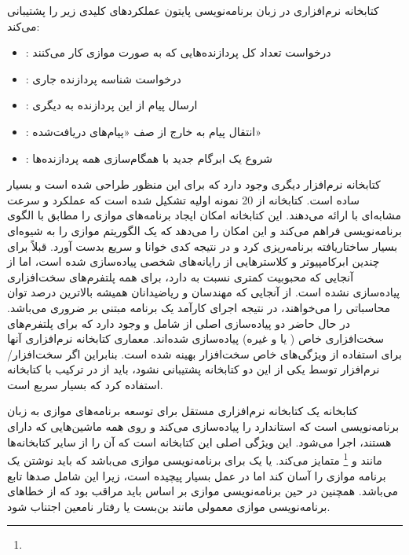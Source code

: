 کتابخانه نرم‌افزاری  در زبان برنامه‌نویسی پایتون عملکردهای کلیدی زیر را پشتیبانی می‌کند: 
\begin{itemize}
	\item 
	: درخواست تعداد کل پردازنده‌هایی که به صورت موازی کار می‌کنند
	\item
	: درخواست شناسه پردازنده جاری   
	\item 
	: ارسال پیام از این پردازنده به دیگری
	\item 
	: انتقال پیام به خارج از صف «پیام‌های دریافت‌شده»
	\item 
	: شروع یک ابرگام جدید با همگام‌سازی همه پردازنده‌ها
\end{itemize}

کتابخانه نرم‌افزار دیگری وجود دارد که برای این منظور طراحی شده است و بسیار ساده است. کتابخانه  از 20 نمونه اولیه تشکیل شده است که عملکرد و سرعت مشابه‌ای با  ارائه می‌دهند. این کتابخانه امکان  ایجاد برنامه‌های موازی را مطابق با الگوی برنامه‌نویسی  فراهم می‌کند و این امکان را می‌دهد که یک الگوریتم موازی را به شیوه‌ای بسیار ساختاریافته برنامه‌ریزی کرد و در نتیجه کدی خوانا و سریع بدست آورد.  قبلاً برای چندین ابرکامپیوتر و کلاسترهایی از رایانه‌های شخصی پیاده‌سازی شده است، اما از آنجایی که محبوبیت کمتری نسبت به  دارد، برای همه پلتفرم‌های سخت‌افزاری پیاده‌سازی نشده است. از آنجایی که مهندسان و ریاضیدانان همیشه بالاترین درصد توان محاسباتی را می‌خواهند، در نتیجه اجرای کارآمد یک برنامه مبتنی بر  ضروری می‌باشد. در حال حاضر دو پیاده‌سازی اصلی از  شامل  و  وجود دارد که برای پلتفرم‌های سخت‌افزاری خاص ( یا  و غیره) پیاده‌سازی شده‌اند. معماری کتابخانه نرم‌افزاری آنها برای استفاده از ویژگی‌های خاص سخت‌افزار بهینه شده است. بنابراین اگر سخت‌افزار/نرم‌افزار توسط یکی از این دو کتابخانه پشتیبانی نشود، باید از  در ترکیب با کتابخانه  استفاده کرد که بسیار سریع است. 

کتابخانه  یک کتابخانه نرم‌افزاری مستقل برای توسعه برنامه‌های موازی به زبان برنامه‌نویسی  است که استاندارد \cite{BSPLib} را پیاده‌سازی می‌کند و روی همه ماشین‌هایی که دارای  هستند، اجرا می‌شود. این ویژگی اصلی این کتابخانه است که آن را از سایر کتابخانه‌ها مانند  و \cite{PUB1,PUB2}\footnote{} متمایز می‌کند.  یا  یک  برای برنامه‌نویسی موازی می‌باشد که باید نوشتن یک برنامه موازی را آسان کند اما در عمل بسیار پیچیده است، زیرا این  شامل صدها تابع می‌باشد. همچنین در حین برنامه‌نویسی موازی بر اساس  باید مراقب بود که از خطاهای برنامه‌نویسی موازی معمولی مانند بن‌بست یا رفتار نامعین اجتناب شود. 

